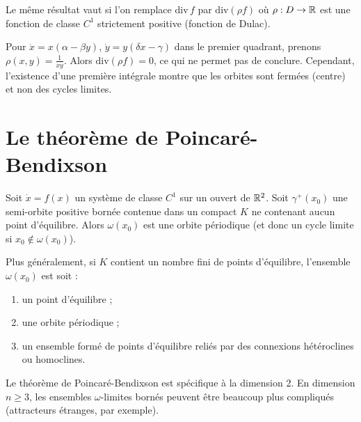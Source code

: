 \begin{theoreme}
Le m\^eme r\'esultat vaut si l'on remplace $\mathrm{div}\, f$ par
$\mathrm{div}(\rho f)$ o\`u $\rho : D \to \mathbb{R}$ est une fonction de classe
$C^1$ strictement positive (fonction de Dulac).
\end{theoreme}

\begin{exemple}
Pour $\dot{x} = x(\alpha - \beta y)$, $\dot{y} = y(\delta x - \gamma)$ dans
le premier quadrant, prenons $\rho(x,y) = \frac{1}{xy}$. Alors
$\mathrm{div}(\rho f) = 0$, ce qui ne permet pas de conclure. Cependant,
l'existence d'une premi\`ere int\'egrale montre que les orbites sont
ferm\'ees (centre) et non des cycles limites.
\end{exemple}

\section{Le th\'eor\`eme de Poincar\'e-Bendixson}

\begin{theoreme}
\label{thm:poincare-bendixson}
Soit $\dot{x} = f(x)$ un syst\`eme de classe $C^1$ sur un ouvert de $\mathbb{R}^2$.
Soit $\gamma^+(x_0)$ une semi-orbite positive born\'ee contenue dans un
compact $K$ ne contenant aucun point d'\'equilibre. Alors
$\omega(x_0)$ est une orbite p\'eriodique (et donc un cycle limite si
$x_0 \notin \omega(x_0)$).
\end{theoreme}

\begin{remarque}
Plus g\'en\'eralement, si $K$ contient un nombre fini de points d'\'equilibre,
l'ensemble $\omega(x_0)$ est soit :
\begin{enumerate}
    \item un point d'\'equilibre ;
    \item une orbite p\'eriodique ;
    \item un ensemble form\'e de points d'\'equilibre reli\'es par des
    connexions h\'et\'eroclines ou homoclines.
\end{enumerate}
\end{remarque}

\begin{attention}[title=\textbf{Dimension 2 uniquement}]
Le th\'eor\`eme de Poincar\'e-Bendixson est sp\'ecifique \`a la dimension 2.
En dimension $n \geq 3$, les ensembles $\omega$-limites born\'es peuvent \^etre
beaucoup plus compliqu\'es (attracteurs \'etranges, par exemple).
\end{attention}

